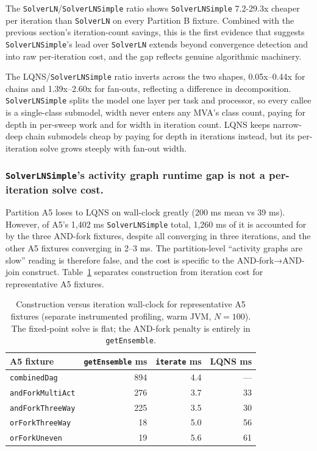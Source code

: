The \texttt{SolverLN}/\texttt{SolverLNSimple} ratio shows \texttt{SolverLNSimple} 7.2-29.3x cheaper per iteration than \texttt{SolverLN} on every Partition B fixture. Combined with the previous section's iteration-count savings, this is the first evidence that suggests \texttt{SolverLNSimple}'s lead over \texttt{SolverLN} extends beyond convergence detection and into raw per-iteration cost, and the gap reflects genuine algorithmic machinery. 

The LQNS/\texttt{SolverLNSimple} ratio inverts across the two shapes, 0.05x--0.44x for chains and 1.39x--2.60x for fan-outs, reflecting a difference in decomposition. \texttt{SolverLNSimple} splits the model one layer per task and processor, so every callee is a single-class submodel, width never enters any MVA's class count, paying for depth in per-sweep work and for width in iteration count. LQNS keeps narrow-deep chain submodels cheap by paying for depth in iterations instead, but its per-iteration solve grows steeply with fan-out width.

\subsubsection*{\texttt{SolverLNSimple}'s activity graph runtime gap is not a per-iteration solve cost.} 
Partition A5 loses to LQNS on wall-clock greatly (200 ms mean vs 39 ms). However, of A5's 1,402 ms \texttt{SolverLNSimple} total, 1,260 ms of it is accounted for by the three AND-fork fixtures, despite all converging in three iterations, and the other A5 fixtures converging in 2--3 ms. The partition-level ``activity graphs are slow'' reading is therefore false, and the cost is specific to the AND-fork→AND-join construct. Table~\ref{tab:eval-a5-construct-split} separates construction from iteration cost for representative A5 fixtures.

\begin{table}[h]
\centering
\footnotesize
\setlength{\tabcolsep}{4pt}
\begin{tabular}{|l|r|r|r|}
\hline
A5 fixture & \texttt{getEnsemble} ms & \texttt{iterate} ms & LQNS ms \\
\hline
\texttt{combinedDag}     & 894 & 4.4 & --- \\ \hline
\texttt{andForkMultiAct} & 276 & 3.7 & 33 \\ \hline
\texttt{andForkThreeWay} & 225 & 3.5 & 30 \\ \hline
\texttt{orForkThreeWay}  &  18 & 5.0 & 56 \\ \hline
\texttt{orForkUneven}    &  19 & 5.6 & 61 \\ \hline
\end{tabular}
\caption{Construction versus iteration wall-clock for representative A5 fixtures (separate instrumented profiling, warm JVM, $N=100$). The fixed-point solve is flat; the AND-fork penalty is entirely in \texttt{getEnsemble}.}
\label{tab:eval-a5-construct-split}
\end{table}

